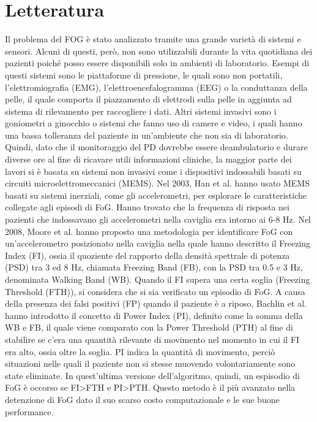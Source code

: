 

\chapter{Letteratura}\label{chap2:related}
Il problema del FOG è stato analizzato tramite una grande varietà di sistemi e sensori. Alcuni di questi, però, non sono utilizzabili durante la vita quotidiana dei pazienti poiché posso essere disponibili solo in ambienti di laboratorio. Esempi di questi sistemi sono le piattaforme di pressione\cite{38}, le quali sono non portatili, l'elettromiografia (EMG)\cite{25}, l'elettroencefalogramma (EEG)\cite{42} o la conduttanza della pelle\cite{43}, il quale comporta il piazzamento di elettrodi sulla pelle in aggiunta ad sistema di rilevamento per raccogliere i dati.
Altri sistemi invasivi sono i goniometri a ginocchio\cite{23} o sistemi che fanno uso di camere e video, i quali hanno una bassa tolleranza del paziente in un'ambiente che non sia di laboratorio\cite{23,39,44}. Quindi, dato che il monitoraggio del PD dovrebbe essere deambulatorio e  durare diverse ore al fine di ricavare utili informazioni cliniche\cite{34,45}, la maggior parte dei lavori si è basata su sistemi non invasivi come i dispositivi indossabili basati su circuiti microelettromeccanici (MEMS). \newline
Nel 2003, Han et al. hanno usato MEMS basati su sistemi inerziali, come gli accelerometri, per esplorare le caratteristiche collegate agli episodi di FoG. Hanno trovato che la frequenza di risposta nei pazienti che indossavano gli accelerometri nella caviglia era intorno ai 6-8 Hz\cite{19}. Nel 2008, Moore et al. hanno proposto una metodologia per identificare FoG con un'accelerometro posizionato nella caviglia nella quale hanno descritto il Freezing Index (FI), ossia il quoziente del rapporto della densità spettrale di potenza (PSD) tra 3 ed 8 Hz, chiamata Freezing Band (FB), con la PSD tra 0.5 e 3 Hz, denominata Walking Band (WB)\cite{21}. Quando il FI supera una certa soglia (Freezing Threshold (FTH)), si considera che si sia verificato un episodio di FoG. A causa della presenza dei falsi positivi (FP) quando il paziente è a riposo, Bachlin et al. hanno introdotto il concetto di Power Index (PI), definito come la somma della WB e FB, il quale viene comparato con la Power Threshold (PTH) al fine di stabilire se c'era una quantità rilevante di movimento nel momento in cui il FI era alto, ossia oltre la soglia\cite{21}. PI indica la quantità di movimento, perciò situazioni nelle quali il paziente non si stesse muovendo volontariamente sono state eliminate. In quest'ultima versione dell'algoritmo, quindi, un espisodio di FoG è occorso se FI>FTH e PI>PTH. Questo metodo è il più avanzato nella detenzione di FoG dato il suo scarso costo computazionale e le sue buone performance\cite{22}. \newline
